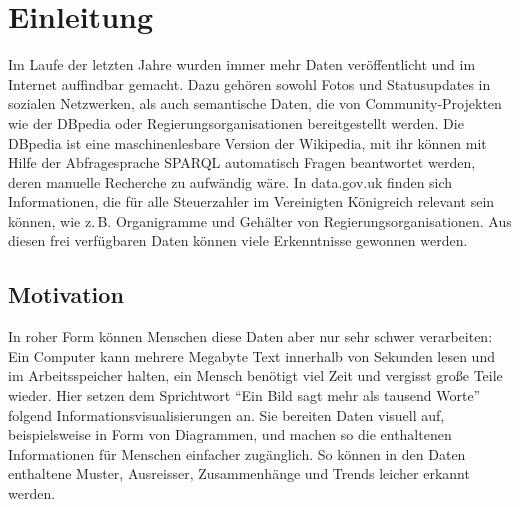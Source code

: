 \documentclass[
	headsepline,
	footsepline,
	fontsize=12pt,
	bibliography=totoc
]{scrbook}
\begin{document}
\frontmatter
{}
\mmtfrontmatter

\listoffigures
\listoftables
\printglossary[type=\acronymtype,style=long,title=Abkürzungsverzeichnis,toctitle=Abkürzungsverzeichnis]

\mainmatter

\chapter{Einleitung}
\label{chapter:einleitung}


Im Laufe der letzten Jahre wurden immer mehr Daten veröffentlicht und im Internet auffindbar gemacht. Dazu gehören sowohl Fotos und Statusupdates in sozialen Netzwerken, als auch semantische Daten, die von Community-Projekten wie der DBpedia oder Regierungsorganisationen bereitgestellt werden. Die DBpedia ist eine maschinenlesbare Version der Wikipedia, mit ihr können mit Hilfe der Abfragesprache SPARQL automatisch Fragen beantwortet werden, deren manuelle Recherche zu aufwändig wäre. In data.gov.uk finden sich Informationen, die für alle Steuerzahler im Vereinigten Königreich relevant sein können, wie z.\,B. Organigramme und Gehälter von Regierungsorganisationen. Aus diesen frei verfügbaren Daten können viele Erkenntnisse gewonnen werden.

\section{Motivation}
\label{section:einleitung:motivation}


In roher Form können Menschen diese Daten aber nur sehr schwer verarbeiten: Ein Computer kann mehrere Megabyte Text innerhalb von Sekunden lesen und im Arbeitsspeicher halten, ein Mensch benötigt viel Zeit und vergisst große Teile wieder. Hier setzen dem Sprichtwort \enquote{Ein Bild sagt mehr als tausend Worte} folgend Informationsvisualisierungen an. Sie bereiten Daten visuell auf, beispielsweise in Form von Diagrammen, und machen so die enthaltenen Informationen für Menschen einfacher zugänglich. So können in den Daten enthaltene Muster, Ausreisser, Zusammenhänge und Trends leicher erkannt werden.
\end{document}
